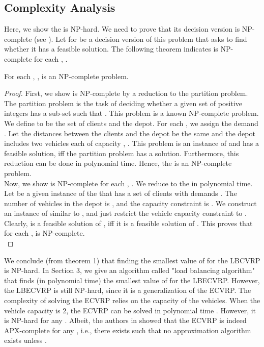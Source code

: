 \subsection{Complexity Analysis}
\noindent Here, we show the  is NP-hard. We need to prove that its decision version is NP-complete (see \cite{Garey}). Let   for  be a decision version of this problem that asks to find whether it has a feasible solution. The following theorem indicates   is NP-complete for each , . 
\begin{theorem}
For each , ,   is an NP-complete problem.
\end{theorem}
\begin{proof}
\noindent  First, we show  is NP-complete by a reduction to the partition problem. The partition problem is the task of deciding whether a given set  of positive integers has a sub-set   such that . This problem is a known NP-complete problem. We define  to be the set of clients and the depot. For each , we assign the demand . Let the distances between the clients and the depot be the same and the depot includes two vehicles each of capacity , . This problem is an instance of  and has a feasible solution, iff the partition problem has a solution. Furthermore, this reduction can be done in polynomial time. Hence, the  is an NP-complete problem. \\
\indent Now, we show  is NP-complete for each , . We reduce  to the  in polynomial time. Let  be a given instance of the  that has a set of clients  with demands . The number of vehicles in the depot is , and the capacity constraint is . We construct an instance  of  similar to , and just restrict the vehicle capacity constraint to . Clearly,  is a feasible solution of , iff it is a feasible solution of . This proves that for each ,  is NP-complete.\\
 
\end{proof}

\indent We conclude (from theorem 1) that finding the smallest value of  for the LBCVRP is NP-hard. In Section 3, we give an algorithm called "load balancing algorithm" that finds (in polynomial time) the smallest value of  for the LBECVRP. However, the LBECVRP is still NP-hard, since it is a generalization of the ECVRP. The complexity of solving the ECVRP relies on the capacity of the vehicles. When the vehicle capacity is 2, the ECVRP can be solved in polynomial time \cite{Asano1996}. However, it is NP-hard for any  \cite{Asano1996}. Albeit, the authors in \cite{Asano1996} showed that the ECVRP is indeed APX-complete for any , i.e., there exists  such that no  approximation algorithm exists unless .
